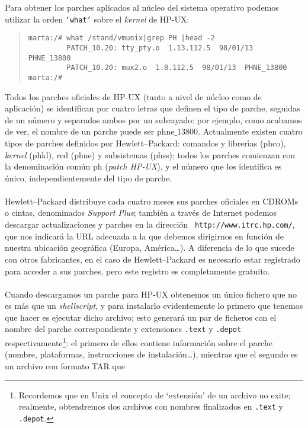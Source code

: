 Para obtener los parches aplicados al n\'ucleo del sistema operativo podemos
utilizar la orden {\tt `what'} sobre el {\it kernel} de HP-UX:
\begin{quote}
\begin{verbatim}
marta:/# what /stand/vmunix|grep PH |head -2
         PATCH_10.20: tty_pty.o  1.13.112.5  98/01/13  PHNE_13800
         PATCH_10.20: mux2.o  1.8.112.5  98/01/13  PHNE_13800
marta:/#
\end{verbatim}
\end{quote}
Todos los parches oficiales de HP-UX (tanto a nivel de n\'ucleo como de 
aplicaci\'on) se identifican por cuatro letras que definen el tipo de parche, 
seguidas de un n\'umero y 
separados ambos por un subrayado: por ejemplo, como acabamos de ver, 
el nombre de un parche puede ser {\sc phne$\_$13800}. Actualmente existen 
cuatro tipos de parches definidos por Hewlett--Packard: comandos y 
librer\'{\i}as ({\sc phco}), {\it kernel} ({\sc phkl}), red ({\sc phne}) y 
subsistemas ({\sc phss}); todos los parches comienzan con la denominaci\'on 
com\'un {\sc ph} ({\it patch HP-UX}), y el n\'umero que los identifica es 
\'unico, independientemente del tipo de parche.\\
\\Hewlett--Packard distribuye cada cuatro meses sus parches oficiales en CDROMs 
o cintas, denominados {\it Support Plus}; tambi\'en a trav\'es de Internet 
podemos descargar actualizaciones y parches en la direcci\'on {\tt 
http://www.itrc.hp.com/}, que nos indicar\'a la URL adecuada a la que debemos
dirigirnos en funci\'on de nuestra ubicaci\'on geogr\'afica (Europa, 
Am\'erica\ldots). A diferencia de lo que sucede con otros fabricantes, en el 
caso de Hewlett--Packard es necesario estar registrado para acceder a sus 
parches, pero este registro es completamente gratuito.\\
\\Cuando descargamos un parche para HP-UX obtenemos un \'unico fichero que no 
es m\'as que un {\it shellscript}, y para instalarlo evidentemente lo primero
que tenemos que hacer es ejecutar dicho archivo; esto generar\'a un par de 
ficheros con
el nombre del parche correspondiente y extensiones {\tt .text} y {\tt .depot}
respectivamente\footnote{Recordemos que en Unix el concepto de `extensi\'on' de 
un archivo no exite; realmente, obtendremos dos archivos con nombres 
finalizados en {\tt .text} y {\tt .depot}.}: el primero de ellos contiene 
informaci\'on sobre el parche (nombre, plataformas, instrucciones de 
instalaci\'on\ldots), mientras que el segundo es un archivo con formato TAR que
